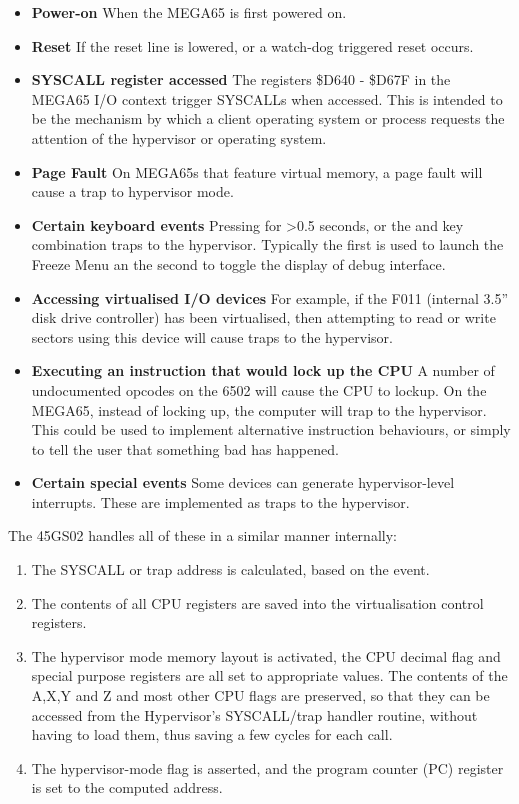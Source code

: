 \begin{itemize}
\item{\bf Power-on} When the MEGA65 is first powered on.
\item{\bf Reset} If the reset line is lowered, or a watch-dog triggered reset occurs.
\item{\bf SYSCALL register accessed} The registers \$D640 - \$D67F in the MEGA65 I/O context trigger SYSCALLs when accessed.
  This is intended to be the mechanism by which a client operating system or process requests the attention of the hypervisor or operating system.
\item{\bf Page Fault} On MEGA65s that feature virtual memory, a page fault will cause a trap to hypervisor mode.
\item{\bf Certain keyboard events} Pressing  for >0.5 seconds, or the  and
 key combination traps to the hypervisor.  Typically the first is used to launch the Freeze Menu an the second to toggle the display of debug interface.
\item{\bf Accessing virtualised I/O devices} For example, if the F011 (internal 3.5'' disk drive controller) has been virtualised, then attempting to read or write sectors using this device will cause traps to the hypervisor.
  \item{\bf Executing an instruction that would lock up the CPU} A number of undocumented opcodes on the 6502 will cause the CPU to lockup.  On the MEGA65, instead of locking up, the computer will trap to the hypervisor.  This could be used to implement alternative instruction behaviours, or simply to tell the user that something bad has happened.
  \item{\bf Certain special events} Some devices can generate hypervisor-level interrupts. These are implemented as traps to the hypervisor.
\end{itemize}

The 45GS02 handles all of these in a similar manner internally:

\begin{enumerate}
\item The SYSCALL or trap address is calculated, based on the event.
\item The contents of all CPU registers are saved into the virtualisation control registers.
\item The hypervisor mode memory layout is activated, the CPU decimal flag and special purpose registers are all set to appropriate values.  The contents of the A,X,Y and Z and most other CPU flags are preserved, so that they can be accessed from the Hypervisor's SYSCALL/trap handler routine, without having to load them, thus saving a few cycles for each call.
\item The hypervisor-mode flag is asserted, and the program counter (PC) register is set to the computed address.
\end{enumerate}

